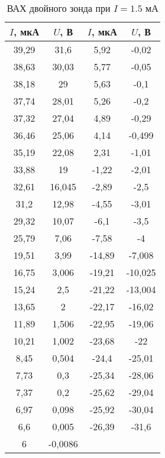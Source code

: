 \begin{table}[h!]
    \centering
    \begin{tabular}{|c|c|c|c|}
    \hline
    $I$, мкА & $U$, В   & $I$, мкА & $U$, В    \\ \hline
    39,29    & 31,6     & 5,92     & -0,02     \\ \hline
    38,63    & 30,03    & 5,77     & -0,05     \\ \hline
    38,18    & 29       & 5,63     & -0,1      \\ \hline
    37,74    & 28,01    & 5,26     & -0,2      \\ \hline
    37,32    & 27,04    & 4,89     & -0,29     \\ \hline
    36,46    & 25,06    & 4,14     & -0,499    \\ \hline
    35,19    & 22,08    & 2,31     & -1,01     \\ \hline
    33,88    & 19       & -1,22    & -2,01     \\ \hline
    32,61    & 16,045   & -2,89    & -2,5      \\ \hline
    31,2     & 12,98    & -4,55    & -3,01     \\ \hline
    29,32    & 10,07    & -6,1     & -3,5      \\ \hline
    25,79    & 7,06     & -7,58    & -4        \\ \hline
    19,51    & 3,99     & -14,89   & -7,008    \\ \hline
    16,75    & 3,006    & -19,21   & -10,025   \\ \hline
    15,24    & 2,5      & -21,22   & -13,004   \\ \hline
    13,65    & 2        & -22,17   & -16,02    \\ \hline
    11,89    & 1,506    & -22,95   & -19,06    \\ \hline
    10,21    & 1,002    & -23,68   & -22       \\ \hline
    8,45     & 0,504    & -24,4    & -25,01    \\ \hline
    7,73     & 0,3      & -25,34   & -28,06    \\ \hline
    7,37     & 0,2      & -25,62   & -29,04    \\ \hline
    6,97     & 0,098    & -25,92   & -30,04    \\ \hline
    6,6      & 0,005    & -26,39   & -31,6     \\ \hline
    6        & -0,0086  &          &           \\ \hline
    \end{tabular}
    \caption{ВАХ двойного зонда при $I = 1.5$ мА}
    \label{VAC4}
\end{table}